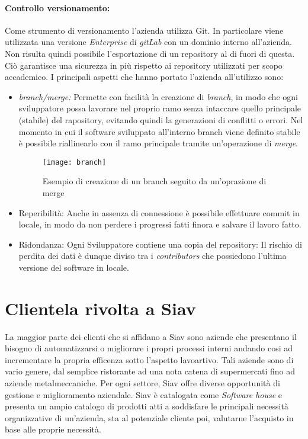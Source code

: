\paragraph{Controllo versionamento:}
Come strumento di versionamento l'azienda utilizza Git. In particolare viene utilizzata una versione \textit{Enterprise} di \textit{gitLab} con un dominio interno all'azienda. Non risulta quindi possibile l'esportazione di un repository al di fuori di questa. Ciò garantisce una sicurezza in più rispetto ai repository utilizzati per scopo accademico.
I principali aspetti che hanno portato l'azienda all'utilizzo sono:
\begin{itemize}
	\item \textit{branch/merge:} Permette con facilità la creazione di \textit{branch}, in modo che ogni sviluppatore possa lavorare nel proprio ramo senza intaccare quello principale (stabile) del rapository, evitando quindi la generazioni di conflitti o errori. Nel momento in cui il software sviluppato all'interno branch viene definito stabile è possibile riallinearlo con il ramo principale tramite un'operazione di \textit{merge}.
	\begin{figure}[!h] 
		\centering 
		\texttt{[image: branch]} 
		\caption{Esempio di creazione di un branch seguito da un'oprazione di merge}
	\end{figure}
	\item Reperibilità: Anche in assenza di connessione è possibile effettuare commit in locale, in modo da non perdere i progressi fatti finora e salvare il lavoro fatto.
	\item Ridondanza: Ogni Sviluppatore contiene una copia del repository: Il rischio di perdita dei dati è dunque diviso tra i \textit{contributors} che possiedono l'ultima versione del software in locale.
\end{itemize} 
\section{Clientela rivolta a Siav}
La maggior parte dei clienti che si affidano a Siav sono aziende che presentano il bisogno di automatizzarsi o migliorare i propri processi interni andando cosi ad incrementare la propria efficenza sotto l'aspetto lavoartivo. Tali aziende sono di vario genere, dal semplice ristorante ad una nota catena di supermercati fino ad aziende metalmeccaniche. Per ogni settore, Siav offre diverse opportunità di gestione e miglioramento aziendale.
Siav è catalogata come \textit{Software house} e presenta un ampio catalogo di prodotti atti a soddisfare le principali necessità organizzative di un'azienda, sta al potenziale cliente poi, valutarne l'acquisto in base alle proprie necessità. 
